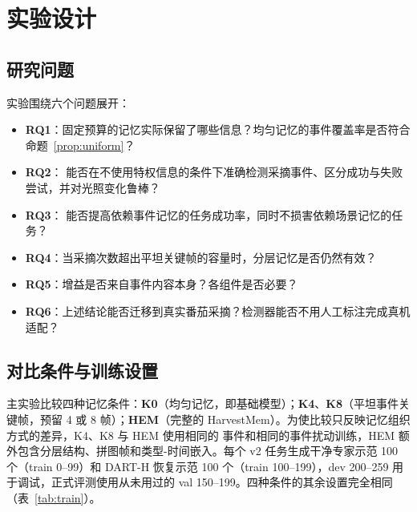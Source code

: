 \section{实验设计}
\label{sec:design}

\subsection{研究问题}
实验围绕六个问题展开：
\begin{itemize}
\item \textbf{RQ1}：固定预算的记忆实际保留了哪些信息？均匀记忆的事件覆盖率是否符合命题~\ref{prop:uniform}？
\item \textbf{RQ2}：\pedet{} 能否在不使用特权信息的条件下准确检测采摘事件、区分成功与失败尝试，并对光照变化鲁棒？
\item \textbf{RQ3}：\hem{} 能否提高依赖事件记忆的任务成功率，同时不损害依赖场景记忆的任务？
\item \textbf{RQ4}：当采摘次数超出平坦关键帧的容量时，分层记忆是否仍然有效？
\item \textbf{RQ5}：增益是否来自事件内容本身？各组件是否必要？
\item \textbf{RQ6}：上述结论能否迁移到真实番茄采摘？检测器能否不用人工标注完成真机适配？
\end{itemize}

\subsection{对比条件与训练设置}
主实验比较四种记忆条件：\textbf{K0}（均匀记忆，即基础模型）；\textbf{K4}、\textbf{K8}（平坦事件关键帧，预留 4 或 8 帧）；\textbf{HEM}（完整的 HarvestMem）。为使比较只反映记忆组织方式的差异，K4、K8 与 HEM 使用相同的 \pedet{} 事件和相同的事件扰动训练，HEM 额外包含分层结构、拼图帧和类型-时间嵌入。每个 v2 任务生成干净专家示范 100 个（train 0--99）和 DART-H 恢复示范 100 个（train 100--199），dev 200--259 用于调试，正式评测使用从未用过的 val 150--199。四种条件的其余设置完全相同（表~\ref{tab:train}）。

